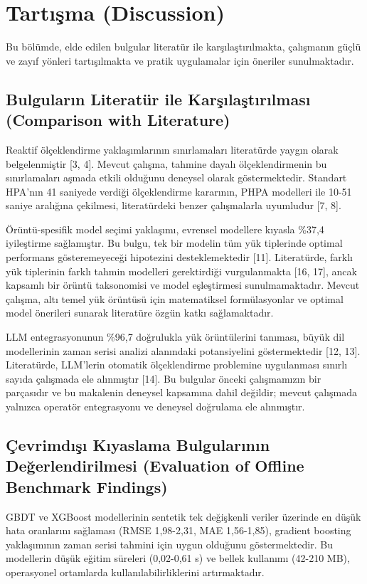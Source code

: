 
\section{Tartışma (Discussion)}

Bu bölümde, elde edilen bulgular literatür ile karşılaştırılmakta, çalışmanın güçlü ve zayıf yönleri tartışılmakta ve pratik uygulamalar için öneriler sunulmaktadır.

\subsection{Bulguların Literatür ile Karşılaştırılması (Comparison with Literature)}

Reaktif ölçeklendirme yaklaşımlarının sınırlamaları literatürde yaygın olarak belgelenmiştir [3, 4]. Mevcut çalışma, tahmine dayalı ölçeklendirmenin bu sınırlamaları aşmada etkili olduğunu deneysel olarak göstermektedir. Standart HPA'nın 41 saniyede verdiği ölçeklendirme kararının, PHPA modelleri ile 10-51 saniye aralığına çekilmesi, literatürdeki benzer çalışmalarla uyumludur [7, 8].

Örüntü-spesifik model seçimi yaklaşımı, evrensel modellere kıyasla \%37,4 iyileştirme sağlamıştır. Bu bulgu, tek bir modelin tüm yük tiplerinde optimal performans gösteremeyeceği hipotezini desteklemektedir [11]. Literatürde, farklı yük tiplerinin farklı tahmin modelleri gerektirdiği vurgulanmakta [16, 17], ancak kapsamlı bir örüntü taksonomisi ve model eşleştirmesi sunulmamaktadır. Mevcut çalışma, altı temel yük örüntüsü için matematiksel formülasyonlar ve optimal model önerileri sunarak literatüre özgün katkı sağlamaktadır.

LLM entegrasyonunun \%96,7 doğrulukla yük örüntülerini tanıması, büyük dil modellerinin zaman serisi analizi alanındaki potansiyelini göstermektedir [12, 13]. Literatürde, LLM'lerin otomatik ölçeklendirme problemine uygulanması sınırlı sayıda çalışmada ele alınmıştır [14]. Bu bulgular önceki çalışmamızın bir parçasıdır ve bu makalenin deneysel kapsamına dahil değildir; mevcut çalışmada yalnızca operatör entegrasyonu ve deneysel doğrulama ele alınmıştır.

\subsection{Çevrimdışı Kıyaslama Bulgularının Değerlendirilmesi (Evaluation of Offline Benchmark Findings)}

GBDT ve XGBoost modellerinin sentetik tek değişkenli veriler üzerinde en düşük hata oranlarını sağlaması (RMSE 1,98-2,31, MAE 1,56-1,85), gradient boosting yaklaşımının zaman serisi tahmini için uygun olduğunu göstermektedir. Bu modellerin düşük eğitim süreleri (0,02-0,61 s) ve bellek kullanımı (42-210 MB), operasyonel ortamlarda kullanılabilirliklerini artırmaktadır.

